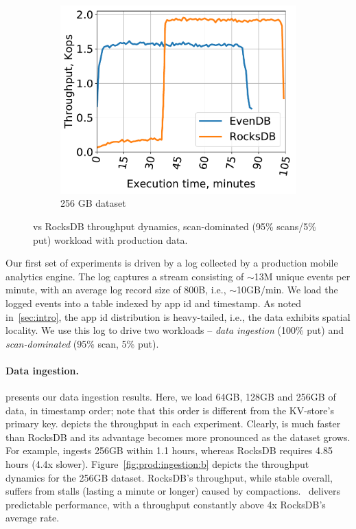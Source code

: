 \begin{figure}[tb]
\begin{subfigure}{0.29\linewidth}
\includegraphics[width=\textwidth]{figs/throughput_256_scans_10s_line.pdf}
\caption{256 GB dataset}
\label{fig:prod:analytics:c}
\end{subfigure}
\caption{\sys\/ vs RocksDB throughput dynamics,  scan-dominated (95\% scans/5\% put) workload with production data.}
\label{fig:prod:analytics}
\end{figure}

Our first set of experiments is driven by a log collected by a production mobile analytics engine. The log captures 
a stream consisting of $\sim$13M unique events per minute, with an average log record size of 800B, i.e., $\sim$10GB/min. 
We load the logged events into a table indexed by app id and timestamp. 
As noted in~\cref{sec:intro}, the app id distribution is heavy-tailed, i.e., the data exhibits spatial locality. 
We use this log to drive two workloads -- \emph{data ingestion} (100\% put) and \emph{scan-dominated} (95\% scan, 5\% put).

\paragraph{Data ingestion.} 
 presents our  data ingestion results. 
Here, we load 64GB, 128GB and 256GB of data, in timestamp order; note that this order is different from the KV-store's primary key. 
  depicts the throughput in each experiment. Clearly, \sys\/ is much faster than RocksDB and its advantage 
becomes more pronounced as the dataset grows. For example, \sys\/ ingests 256GB  within 1.1 hours, 
whereas RocksDB requires 4.85 hours (4.4x slower). Figure~\ref{fig:prod:ingestion:b} depicts the  
throughput dynamics for the 256GB dataset. RocksDB's throughput, while stable overall, suffers from stalls 
(lasting a minute or longer) caused by compactions. 
\sys\ delivers predictable performance, with a throughput constantly above 4x RocksDB's average rate.

